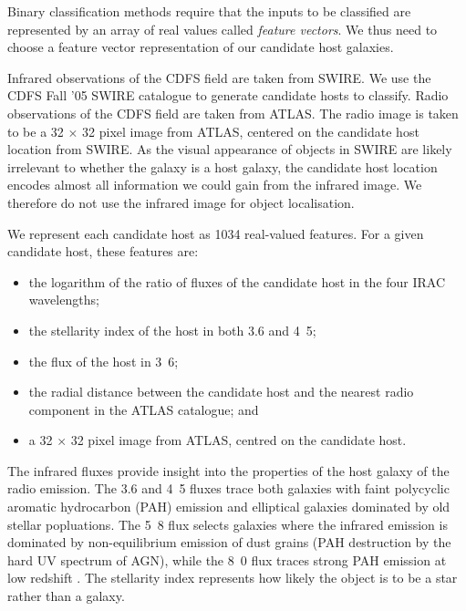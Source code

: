 \documentclass[fleqn,usenatbib,usedcolumn]{mnras}
\begin{document}
    Binary classification methods require that the inputs to be classified are
    represented by an array of real values called \emph{feature vectors}. We
    thus need to choose a feature vector representation of our candidate host
    galaxies.

    Infrared observations of the CDFS field are taken from SWIRE. We use the
    CDFS Fall '05 SWIRE catalogue \citep{surace05swire} to generate candidate
    hosts to classify. Radio observations of the CDFS field are taken from
    ATLAS. The radio image is taken to be a 32 $\times$ 32 pixel image from
    ATLAS, centered on the candidate host location from SWIRE.
    As the visual appearance of objects in SWIRE are likely irrelevant to
    whether the galaxy is a host galaxy, the candidate host location encodes
    almost all information we could gain from the infrared image. We therefore
    do not use the infrared image for object localisation.

    We represent each candidate host as 1034 real-valued features. For a given
    candidate host, these features are:
    \begin{itemize}
      \item the logarithm of the ratio of fluxes of the candidate host in the
        four IRAC wavelengths;
      \item the stellarity index of the host in both 3.6 and
        \unit{4.5}{\micro\meter};
      \item the flux of the host in \unit{3.6}{\micro\meter};
      \item the radial distance between the candidate host and the nearest
        radio component in the ATLAS catalogue; and
      \item a 32 $\times$ 32 pixel image from ATLAS, centred on the candidate
        host.
    \end{itemize}

    The infrared fluxes provide insight into the properties of the host galaxy
    of the radio emission. The 3.6 and \unit{4.5}{\micro\meter} fluxes trace
    both galaxies with faint polycyclic aromatic hydrocarbon (PAH) emission and
    elliptical galaxies dominated by old stellar popluations. The
    \unit{5.8}{\micro\meter} flux selects galaxies where the infrared emission
    is dominated by non-equilibrium emission of dust grains (PAH destruction
    by the hard UV spectrum of AGN), while the \unit{8.0}{\micro\meter} flux
    traces strong PAH emission at low redshift \citep{Sajina2005}.
    The stellarity index represents how likely the object is to be a star
    rather than a galaxy.
\end{document}
